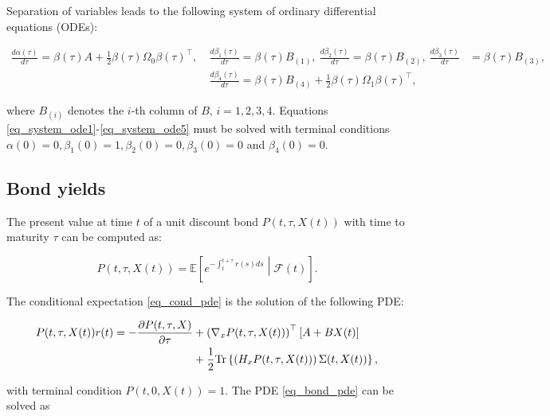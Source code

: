 \documentclass{article}
\begin{document}
Separation of variables leads to the following system of ordinary differential equations (ODEs):

\begin{align} \label{eq_system_ode1} 
\frac{d\alpha(\tau)}{d\tau} = \beta(\tau) A + \frac{1}{2} \beta(\tau) \Omega_0 \beta(\tau)^\top, \ &\frac{d\beta_1(\tau)}{d\tau} = \beta(\tau) B_{(1)}, \ \frac{d\beta_2(\tau)}{d\tau} = \beta(\tau) B_{(2)}, \ \frac{d\beta_3(\tau)}{d\tau} &= \beta(\tau) B_{(3)}, \\
&\frac{d\beta_4(\tau)}{d\tau} = \beta(\tau) B_{(4)} + \frac{1}{2} \beta(\tau) \Omega_1 \beta(\tau)^\top, \label{eq_system_ode5}
\end{align}

\noindent where $B_{(i)}$ denotes the $i$-th column of $B$, $i=1,2,3,4$. Equations \eqref{eq_system_ode1}-\eqref{eq_system_ode5} must be solved with terminal conditions $\alpha(0)=0,\beta_1(0)=1,\beta_2(0)=0,\beta_3(0)=0$ and $\beta_4(0)=0$.

\subsection{Bond yields}


The present value at time $t$ of a unit discount bond $P(t,\tau,X(t))$ with time to maturity $\tau$ can be computed as: 

\begin{equation} \label{eq_cond_pde}
    P(t,\tau,X(t)) = \mathbb{E}\left[e^{-\int_t^{t+\tau} r(s) ds} \middle| \mathcal{F}(t) \right].
\end{equation}

The conditional expectation \eqref{eq_cond_pde} is the solution of the following PDE:

\begin{align} \label{eq_bond_pde}
    P(t,\tau,X(t)) r(t)  = -\frac{\partial P(t,\tau,X)}{\partial \tau} &+ 
    \left(\nabla_x P(t,\tau, X(t)) \right)^\top [{A+B}{X}(t)]\\ \notag
    &+ \frac{1}{2} \text{Tr}\left\{  \left(H_x P(t,\tau, X(t))\right) {\Sigma}(t, X(t)) \right\},
\end{align}

\noindent with terminal condition $P(t,0, X(t)) = 1$. The PDE  \eqref{eq_bond_pde} can be solved as
\end{document}
